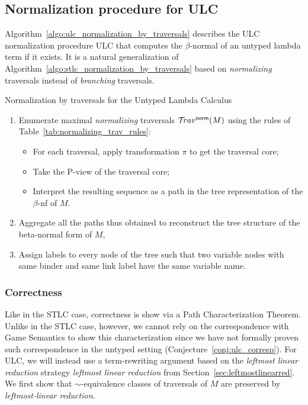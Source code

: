 \documentclass{article}
\theoremstyle{plain}
\theoremstyle{definition}
\theoremstyle{remark}
\newcommand{\normalizing}{{\sf norm}}
\newcommand{\travsetnorm}{\travset^\normalizing}
\def\coresymbol{\pi} %
\begin{document}
\subsection{Normalization procedure for ULC}

Algorithm~\ref{algo:ulc_normalization_by_traversals} describes the ULC normalization procedure ULC that computes the $\beta$-normal of an untyped lambda term if it exists. It is a natural generalization of Algorithm~\ref{algo:stlc_normalization_by_traversals} based on \emph{normalizing} traversals instead of \emph{branching} traversals.

\begin{algorithm}[!ht]
\begin{algorithmic}
\caption{Normalization by traversals for the Untyped Lambda Calculus}
\label{algo:ulc_normalization_by_traversals}
\begin{enumerate}
  \item Enumerate maximal \emph{normalizing} traversals $\travsetnorm(M)$ using the rules of Table~\ref{tab:normalizing_trav_rules}:
  \begin{itemize}
  \item For each traversal, apply transformation $\coresymbol$ to get the traversal core;
  \item Take the P-view of the traversal core;
  \item Interpret the resulting sequence as a path
  in the tree representation of the $\beta$-nf of $M$.
  \end{itemize}
  \item Aggregate all the paths thus obtained to reconstruct the tree structure of the beta-normal form of $M$,
  \item Assign labels to every node of the tree such that two variable nodes with same binder and same link label have the same variable name.
\end{enumerate}
\end{algorithmic}
\end{algorithm}

\subsubsection*{Correctness}

Like in the STLC case, correctness is show via a Path Characterization Theorem.
Unlike in the STLC case, however, we cannot rely on the correspondence with Game Semantics to show this characterization since we have not formally proven such correspondence in the untyped setting (Conjecture~\ref{conj:ulc_corresp}).
For ULC, we will instead use a term-rewriting argument based on the \emph{leftmost linear reduction} strategy \emph{leftmost linear reduction} from Section~\ref{sec:leftmostlinearred}. We first show that $\sim$-equivalence classes of traversals of $M$ are preserved by \emph{leftmost-linear reduction}.
\end{document}
